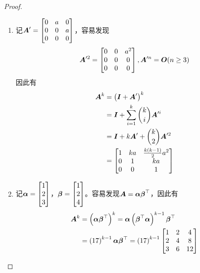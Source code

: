 \begin{proof}
    \begin{enumerate}
        \item 记\(\boldsymbol{A}'=\begin{bmatrix}0&a&0\\0&0&a\\0&0&0\end{bmatrix}\)，容易发现
              \begin{equation*}
                  \boldsymbol{A}'^2=\begin{bmatrix}0&0&a^2\\0&0&0\\0&0&0\end{bmatrix},\boldsymbol{A}'^n=\boldsymbol{O}(n\ge3)
              \end{equation*}
              因此有
              \begin{align*}
                  \boldsymbol{A}^k & =\left( \boldsymbol{I}+\boldsymbol{A}' \right)^k                  \\
                          & =\boldsymbol{I}+\sum_{i=1}^k\binom{k}{i}\boldsymbol{A}'^i \\
                          & =\boldsymbol{I}+k\boldsymbol{A}'+\binom{k}{2}\boldsymbol{A}'^2     \\
                          & =\begin{bmatrix}
                                 1 & ka & \frac{k(k-1)}{2}a^2 \\
                                 0 & 1  & ka                  \\
                                 0 & 0  & 1
                             \end{bmatrix}
              \end{align*}
        \item 记\(\boldsymbol{\alpha}=\begin{bmatrix}1\\2\\3\end{bmatrix}\)，\(\boldsymbol{\beta}=\begin{bmatrix}1\\2\\4\end{bmatrix}\)。容易发现\(\boldsymbol{A}=\boldsymbol{\alpha}\boldsymbol{\beta}^\top\)，因此有
              \begin{align*}
                  \boldsymbol{A}^k & =\left( \boldsymbol{\alpha}\boldsymbol{\beta}^\top \right)^k=\boldsymbol{\alpha}\left( \boldsymbol{\beta}^\top\boldsymbol{\alpha} \right)^{k-1}\boldsymbol{\beta}^\top \\
                          & =\left( 17 \right)^{k-1}\boldsymbol{\alpha}\boldsymbol{\beta}^\top=\left( 17 \right)^{k-1}
                  \begin{bmatrix}
                      1 & 2 & 4 \\2&4&8\\3&6&12
                  \end{bmatrix}
              \end{align*}
    \end{enumerate}
\end{proof}

